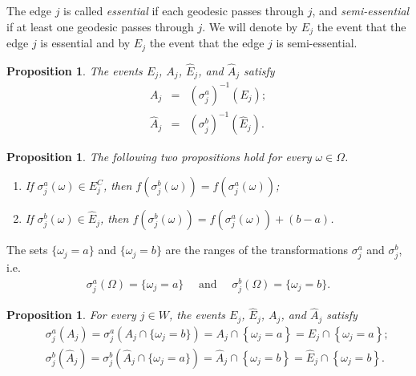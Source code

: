 \documentclass[reqno]{amsart}
\newtheorem{proposition}[theorem]{Proposition}
\begin{document}
The edge $j$ is called {\em essential} if each geodesic passes through $j$, and {\em semi-essential} if at least one geodesic passes through $j$. We will denote by $E_j$ the event that the edge $j$ is essential and by $\hat E_j$ the event that the edge $j$ is semi-essential. 

\begin{proposition}\label{thm|AiDefinition} The events $E_j$, $A_j$, $\hat E_j$, and $\hat A_j$ satisfy
\begin{eqnarray}
 A_j&=&(\sigma_j^a)^{-1}\left(E_j\right); \label{eqn|AiDefinition}\\
 \hat A_j&=&(\sigma_j^b)^{-1}(\hat E_j). \label{eqn|HatAiDefinition}
\end{eqnarray}
\end{proposition}

  
\begin{proposition}\label{thm|forComputer} The following two propositions hold for every $\omega\in\Omega$.
\begin{enumerate}
\item[(a)] If $\sigma_j^a(\omega)\in E_j^C$, then $f(\sigma_j^b(\omega))=f(\sigma_j^a(\omega))$;
\item[(b)] If $\sigma_j^b(\omega)\in \hat E_j$, then $f(\sigma_j^b(\omega))=f(\sigma_j^a(\omega))+(b-a)$.
\end{enumerate}
\end{proposition} 




The sets $\{\omega_j=a\}$ and $\{\omega_j=b\}$ are the ranges of the transformations $\sigma_j^a$ and $\sigma_j^b$, i.e. \begin{eqnarray}
\sigma_j^a\left(\Omega\right)=\{\omega_j=a\}\quad\mbox{ and }\quad 
\sigma_j^b\left(\Omega\right)=\{\omega_j=b\}.
\label{eqn|fixedPointsSigmaJAB}
\end{eqnarray}

 
\begin{proposition} For every $j\in W$, the events $E_j$, $\hat E_j$, $A_j$, and $\hat A_j$ satisfy 
\begin{eqnarray}
&&\sigma_j^a(A_j)=\sigma_j^a(A_j\cap\{\omega_j=b\}) 
=A_j\cap \left\{\omega_j=a\right\} 
=E_j\cap \left\{\omega_j=a\right\}; \label{eqn:AEinclusion}\\
&&\sigma_j^b(\hat A_j) = \sigma_j^b(\hat A_j\cap\{\omega_j=a\})  
=\hat A_j\cap \left\{\omega_j=b\right\} 
=\hat E_j\cap \left\{\omega_j=b\right\}. \label{eqn:HatAEinclusion}
\end{eqnarray}

\end{proposition}
\end{document}
